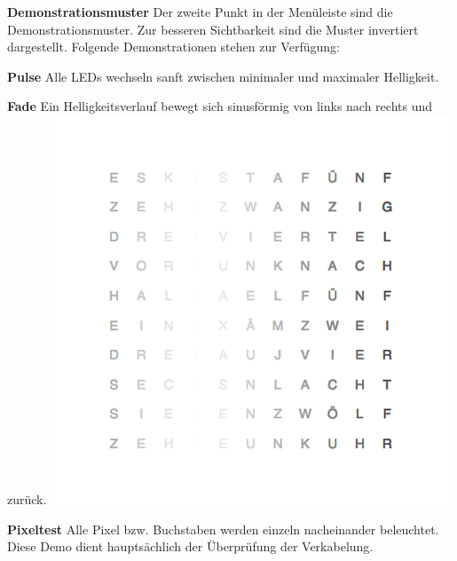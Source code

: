\begin{multicols}{2}
\textbf{Demonstrationsmuster}
Der zweite Punkt in der Menüleiste sind die Demonstrationsmuster. Zur besseren Sichtbarkeit sind die Muster invertiert dargestellt. Folgende Demonstrationen stehen zur Verfügung:

\textbf{Pulse}
Alle LEDs wechseln sanft zwischen minimaler und maximaler Helligkeit.

\textbf{Fade}
Ein Helligkeitsverlauf bewegt sich sinusförmig von links nach rechts und zurück.
\includegraphics[width=\columnwidth]{Abbildungen/Software/Demo/Fade}

\textbf{Pixeltest}
Alle Pixel bzw. Buchstaben werden einzeln nacheinander beleuchtet. Diese Demo dient hauptsächlich der Überprüfung der Verkabelung.


\end{multicols}
